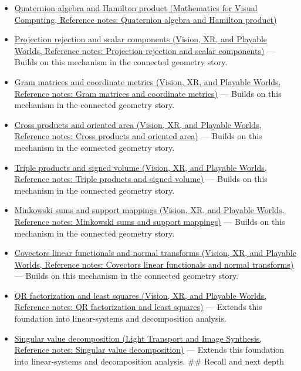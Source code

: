 \begin{itemize}
\item
  \href{../02-Mathematics-for-Visual-Computing/main.pdf\#nameddest=appendix-965d9260eeab}{Quaternion algebra and Hamilton product (Mathematics for Visual Computing, Reference notes: Quaternion algebra and Hamilton product)}
\item
  \href{../07-Vision-XR-and-Playable-Worlds/main.pdf\#nameddest=appendix-505a502c372a}{Projection rejection and scalar components (Vision, XR, and Playable Worlds, Reference notes: Projection rejection and scalar components)} --- Builds on this mechanism in the connected geometry story.
\item
  \href{../07-Vision-XR-and-Playable-Worlds/main.pdf\#nameddest=appendix-3b863809f82a}{Gram matrices and coordinate metrics (Vision, XR, and Playable Worlds, Reference notes: Gram matrices and coordinate metrics)} --- Builds on this mechanism in the connected geometry story.
\item
  \href{../07-Vision-XR-and-Playable-Worlds/main.pdf\#nameddest=appendix-2391db8052b1}{Cross products and oriented area (Vision, XR, and Playable Worlds, Reference notes: Cross products and oriented area)} --- Builds on this mechanism in the connected geometry story.
\item
  \href{../07-Vision-XR-and-Playable-Worlds/main.pdf\#nameddest=appendix-5caa058bd9c7}{Triple products and signed volume (Vision, XR, and Playable Worlds, Reference notes: Triple products and signed volume)} --- Builds on this mechanism in the connected geometry story.
\item
  \href{../07-Vision-XR-and-Playable-Worlds/main.pdf\#nameddest=appendix-215ac7099a82}{Minkowski sums and support mappings (Vision, XR, and Playable Worlds, Reference notes: Minkowski sums and support mappings)} --- Builds on this mechanism in the connected geometry story.
\item
  \href{../07-Vision-XR-and-Playable-Worlds/main.pdf\#nameddest=appendix-46da295c6787}{Covectors linear functionals and normal transforms (Vision, XR, and Playable Worlds, Reference notes: Covectors linear functionals and normal transforms)} --- Builds on this mechanism in the connected geometry story.
\item
  \href{../07-Vision-XR-and-Playable-Worlds/main.pdf\#nameddest=appendix-c3421e6b4f2c}{QR factorization and least squares (Vision, XR, and Playable Worlds, Reference notes: QR factorization and least squares)} --- Extends this foundation into linear-systems and decomposition analysis.
\item
  \href{../04-Light-Transport-and-Image-Synthesis/main.pdf\#nameddest=appendix-1fad5e7f36fa}{Singular value decomposition (Light Transport and Image Synthesis, Reference notes: Singular value decomposition)} --- Extends this foundation into linear-systems and decomposition analysis. \#\# Recall and next depth
\end{itemize}

